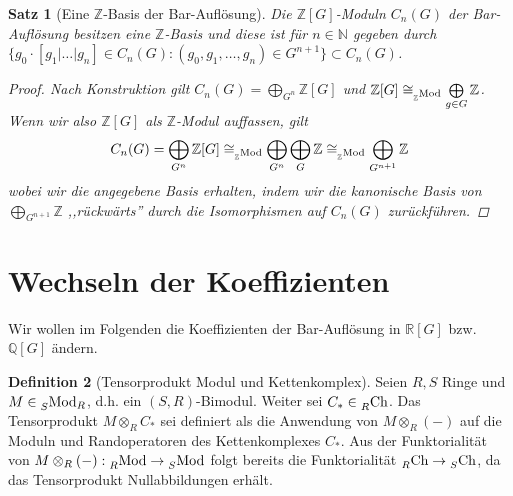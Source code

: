 \documentclass[a4paper,twoside,10pt]{scrreprt}
\newcommand{\Z}{\mathbb{Z}}
\newcommand{\N}{\mathbb{N}}
\newcommand{\Q}{\mathbb{Q}}
\newcommand{\R}{\mathbb{R}}
\newtheorem{satz}{Satz}[section]
\theoremstyle{definition}
\newtheorem{definition}[satz]{Definition}
\begin{document}
\begin{satz}[Eine $\Z$-Basis der Bar-Auflösung]\label{satz:ZBasisOfBarRes}
Die $\Z [G]$-Moduln $C_n(G)$ der Bar-Auflösung besitzen eine $\Z$-Basis und diese ist für $n\in \N$ gegeben durch $\{g_0\cdot [g_1|\ldots|g_n]\in C_n(G):(g_0,g_1,\ldots,g_n)\in G^{n+1}\}\subset C_n(G)$.
\begin{proof}
Nach Konstruktion gilt $C_n(G)=\bigoplus\limits_{G^n} \Z[G]$ und $\Z[G]\cong_{\prescript{}{\Z}{\text{Mod}}}\bigoplus\limits_{g\in G} \Z$. Wenn wir also $\Z[G]$ als $\Z$-Modul auffassen, gilt 
\begin{equation*}
C_n(G)=\bigoplus\limits_{G^n} \Z[G]\cong_{\prescript{}{\Z}{\text{Mod}}}\bigoplus\limits_{G^n}\bigoplus\limits_G \Z\cong_{\prescript{}{\Z}{\text{Mod}}}\bigoplus\limits_{G^{n+1}} \Z
\end{equation*}
wobei wir die angegebene Basis erhalten, indem wir die kanonische Basis von $\bigoplus\limits_{G^{n+1}} \Z$ ,,rückwärts'' durch die Isomorphismen auf $C_n(G)$ zurückführen.
\end{proof}
\end{satz}

\section{Wechseln der Koeffizienten}
Wir wollen im Folgenden die Koeffizienten der Bar-Auflösung in $\R[G]$ bzw. $\Q[G]$ ändern. 
\begin{definition}[Tensorprodukt Modul und Kettenkomplex]\label{def:TensorModCh}
Seien $R,S$ Ringe und $M\in \prescript{}{S}{\text{Mod}}_R$, d.h. ein $(S,R)$-Bimodul. Weiter sei $C_*\in \prescript{}{R}{\text{Ch}}$.
Das Tensorprodukt $M\otimes_{R}C_*$ sei definiert als die Anwendung von $M\otimes_{R}(-)$ auf die Moduln und Randoperatoren des Kettenkomplexes $C_*$. Aus der Funktorialität von $M\otimes_{R}(-):\prescript{}{R}{\text{Mod}}\to \prescript{}{S}{\text{Mod}}$ folgt bereits die Funktorialität $\prescript{}{R}{\text{Ch}}\to \prescript{}{S}{\text{Ch}}$, da das Tensorprodukt Nullabbildungen erhält.
\end{definition}
\end{document}
